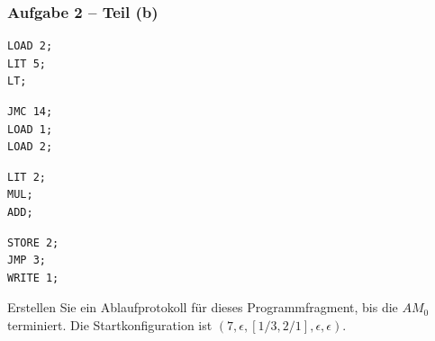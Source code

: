 \documentclass{beamer}
\begin{document}
\begin{frame}[fragile] \frametitle{Aufgabe 2 -- Teil (b)}
	\begin{minipage}{\dimexpr0.25\linewidth-\fboxrule-\fboxsep}
		\begin{lstlisting}[firstnumber=3]
LOAD 2;
LIT 5; 
LT;
		\end{lstlisting}
	\end{minipage}
	\begin{minipage}{\dimexpr0.25\linewidth-\fboxrule-\fboxsep}
		\begin{lstlisting}[firstnumber=6]
JMC 14; 
LOAD 1; 
LOAD 2;
		\end{lstlisting}
	\end{minipage}
	\begin{minipage}{\dimexpr0.25\linewidth-\fboxrule-\fboxsep}
		\begin{lstlisting}[firstnumber=9]
LIT 2;
MUL; 
ADD;
		\end{lstlisting}
	\end{minipage}
	\begin{minipage}{\dimexpr0.25\linewidth-\fboxrule-\fboxsep}
		\begin{lstlisting}[firstnumber=12]
STORE 2; 
JMP 3; 
WRITE 1;
		\end{lstlisting}
	\end{minipage}

	\bigskip 
	
	Erstellen Sie ein Ablaufprotokoll für dieses Programmfragment, bis die $AM_0$ terminiert. Die Startkonfiguration ist $(7, \epsilon, [1/3, 2/1], \epsilon, \epsilon)$.
\end{frame}
\end{document}
